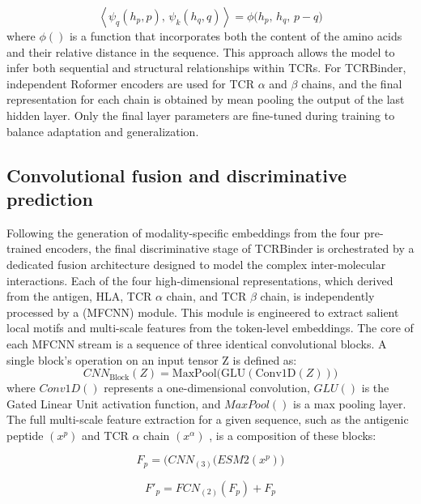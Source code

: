 \documentclass[10pt,letterpaper]{article}
\begin{document}
\begin{equation}
\left\langle \psi_q(h_p, p), \, \psi_k(h_q, q) \right\rangle 
= \phi \big( h_p, \, h_q, \, p - q \big)
\end{equation}
where $\phi()$ is a function that incorporates both the content of the amino acids and their relative distance in the sequence.
This approach allows the model to infer both sequential and structural relationships within TCRs. For TCRBinder, independent Roformer encoders are used for TCR $\alpha$ and $\beta$ chains, and the final representation for each chain is obtained by mean pooling the output of the last hidden layer. Only the final layer parameters are fine-tuned during training to balance adaptation and generalization.

\subsection*{Convolutional fusion and discriminative prediction}
Following the generation of modality-specific embeddings from the four pre-trained encoders, the final discriminative stage of TCRBinder is orchestrated by a dedicated fusion architecture designed to model the complex inter-molecular interactions. Each of the four high-dimensional representations, which derived from the antigen, HLA, TCR $\alpha$ chain, and TCR $\beta$ chain, is independently processed by a (MFCNN) module. This module is engineered to extract salient local motifs and multi-scale features from the token-level embeddings. The core of each MFCNN stream is a sequence of three identical convolutional blocks. A single block's operation on an input tensor Z is defined as:
\begin{equation}
CNN_{\text{Block}}(Z) = \mathrm{MaxPool}\big( \mathrm{GLU}(\mathrm{Conv1D}(Z)))
\end{equation}
where $Conv1D()$ represents a one-dimensional convolution, $GLU()$ is the Gated Linear Unit activation function, and $MaxPool()$ is a max pooling layer. The full multi-scale feature extraction for a given sequence, such as the antigenic peptide $(x^p)$ and  TCR $\alpha$ chain $(x^\alpha)$ , is a composition of these blocks:

\begin{equation}
F_p = (CNN_{(3)}\!( ESM2(x^p) \big)
\end{equation}

\begin{equation}
F'_p = FCN_{(2)}(F_p) + F_p
\end{equation}
\end{document}

